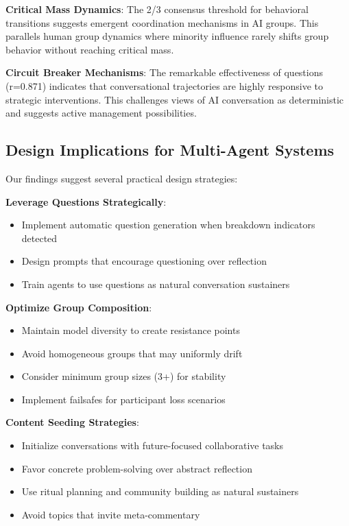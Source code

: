 \documentclass[11pt,letterpaper]{article}
\newcommand{\exponedataQuestionCorrelation}{0.871}
\begin{document}
\textbf{Critical Mass Dynamics}: The 2/3 consensus threshold for behavioral transitions suggests emergent coordination mechanisms in AI groups. This parallels human group dynamics where minority influence rarely shifts group behavior without reaching critical mass.

\textbf{Circuit Breaker Mechanisms}: The remarkable effectiveness of questions (r=\exponedataQuestionCorrelation{}) indicates that conversational trajectories are highly responsive to strategic interventions. This challenges views of AI conversation as deterministic and suggests active management possibilities.

\subsection{Design Implications for Multi-Agent Systems}

Our findings suggest several practical design strategies:

\textbf{Leverage Questions Strategically}:
\begin{itemize}
    \item Implement automatic question generation when breakdown indicators detected
    \item Design prompts that encourage questioning over reflection
    \item Train agents to use questions as natural conversation sustainers
\end{itemize}

\textbf{Optimize Group Composition}:
\begin{itemize}
    \item Maintain model diversity to create resistance points
    \item Avoid homogeneous groups that may uniformly drift
    \item Consider minimum group sizes (3+) for stability
    \item Implement failsafes for participant loss scenarios
\end{itemize}

\textbf{Content Seeding Strategies}:
\begin{itemize}
    \item Initialize conversations with future-focused collaborative tasks
    \item Favor concrete problem-solving over abstract reflection
    \item Use ritual planning and community building as natural sustainers
    \item Avoid topics that invite meta-commentary
\end{itemize}
\end{document}
